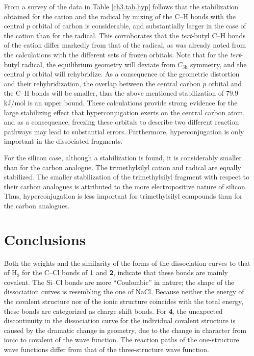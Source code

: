 From a survey of the data in Table \ref{ch3.tab.hyp} follows that the stabilization obtained for the cation and the radical by mixing of the C--H bonds with the central $p$ orbital of carbon is considerable, and substantially larger in the case of the cation than for the radical.  This  corroborates that the \textit{tert}-butyl C--H bonds of the cation differ markedly from that of the radical, as was already noted from the calculations with the different sets of frozen orbitals.  Note that for the \textit{tert}-butyl radical, the equilibrium geometry will deviate from $C_\mathrm{3h}$ symmetry, and the central $p$ orbital will rehybridize.  As a consequence of the geometric distortion and their rehybridization, the overlap between the central carbon $p$ orbital and the C--H bonds will be smaller, thus the above mentioned stabilization of 79.9 kJ/mol is an upper bound.  These calculations provide strong evidence for the large stabilizing effect that hyperconjugation exerts on the central carbon atom, and as a consequence, freezing these orbitals to describe two different reaction pathways may lead to substantial errors.  Furthermore, hyperconjugation is only important in the dissociated fragments.

For the silicon case, although a stabilization is found, it is considerably smaller than for the carbon analogue.  The trimethylsilyl cation and radical are equally stabilized.  The smaller stabilization of the trimethylsilyl fragment with respect to their carbon analogues is attributed to the more electropositive nature of silicon. Thus, hyperconjugation is less important for trimethylsilyl compounds than for the carbon analogues.

\section{Conclusions}

Both the weights and the similarity of the forms of the dissociation curves to that of H$_2$ for the C--Cl bonds of \textbf{1} and \textbf{2}, indicate that these bonds are mainly covalent.  The Si--Cl bonds are more ``Coulombic'' in nature; the shape of the dissociation curves is resembling the one of NaCl. Because neither the energy of the covalent structure nor of the ionic structure coincides with the total energy, these bonds are categorized as charge shift bonds. For \textbf{4}, the unexpected discontinuity in the dissociation curve for the individual covalent structure is caused by the dramatic change in geometry, due to the change in character from ionic to covalent of the wave function.  The reaction paths of the one-structure wave functions differ from that of the three-structure wave function.

